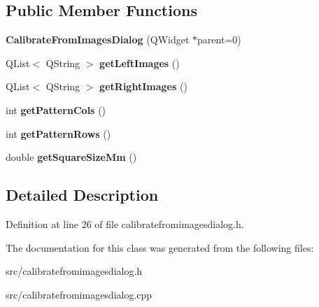 \subsection*{Public Member Functions}
\begin{DoxyCompactItemize}
\item 
\hypertarget{class_calibrate_from_images_dialog_afe59dd44c63c22043a93c37bff3c8d57}{}{\bfseries Calibrate\+From\+Images\+Dialog} (Q\+Widget $\ast$parent=0)\label{class_calibrate_from_images_dialog_afe59dd44c63c22043a93c37bff3c8d57}

\item 
\hypertarget{class_calibrate_from_images_dialog_ad5f15a31b9ca81caf82709ebae582adf}{}Q\+List$<$ Q\+String $>$ {\bfseries get\+Left\+Images} ()\label{class_calibrate_from_images_dialog_ad5f15a31b9ca81caf82709ebae582adf}

\item 
\hypertarget{class_calibrate_from_images_dialog_a475cc42908143419572a8c170f2771f2}{}Q\+List$<$ Q\+String $>$ {\bfseries get\+Right\+Images} ()\label{class_calibrate_from_images_dialog_a475cc42908143419572a8c170f2771f2}

\item 
\hypertarget{class_calibrate_from_images_dialog_ae59e54f4d5b5e70ab518ba7aa39d8c0a}{}int {\bfseries get\+Pattern\+Cols} ()\label{class_calibrate_from_images_dialog_ae59e54f4d5b5e70ab518ba7aa39d8c0a}

\item 
\hypertarget{class_calibrate_from_images_dialog_a34af5e3a9537cfe4785c4f24c6a3460d}{}int {\bfseries get\+Pattern\+Rows} ()\label{class_calibrate_from_images_dialog_a34af5e3a9537cfe4785c4f24c6a3460d}

\item 
\hypertarget{class_calibrate_from_images_dialog_a52c6ef5e5e32a815fcc424182fb97607}{}double {\bfseries get\+Square\+Size\+Mm} ()\label{class_calibrate_from_images_dialog_a52c6ef5e5e32a815fcc424182fb97607}

\end{DoxyCompactItemize}


\subsection{Detailed Description}


Definition at line 26 of file calibratefromimagesdialog.\+h.



The documentation for this class was generated from the following files\+:\begin{DoxyCompactItemize}
\item 
src/calibratefromimagesdialog.\+h\item 
src/calibratefromimagesdialog.\+cpp\end{DoxyCompactItemize}
